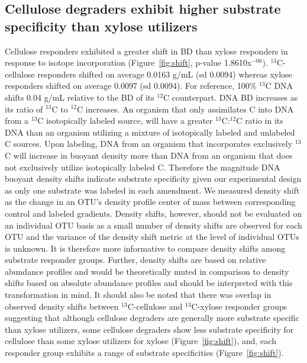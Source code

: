 \subsection{Cellulose degraders exhibit higher substrate specificity than xylose
utilizers} 
Cellulose responders exhibited a greater shift in BD than xylose
responders in response to isotope incorporation (Figure~\ref{fig:shift},
p-value 1.8610x$^{-06}$). $^{13}$C-cellulose responders shifted on average 0.0163
g/mL (sd 0.0094) whereas xylose responders shifted on average 0.0097 (sd
0.0094). For reference, 100\% $^{13}$C DNA shifts 0.04 g/mL relative to the BD
of its $^{12}$C counterpart. DNA BD increases as its ratio of $^{13}$C to
$^{12}$C increases. An organism that only assimilates C into DNA from a
$^{13}$C isotopically labeled source, will have a greater $^{13}$C:$^{12}$C
ratio in its DNA than an organism utilizing a mixture of isotopically labeled
and unlabeled C sources. Upon labeling, DNA from an organism that incorporates
exclusively $^{13}$C will increase in buoyant density more than DNA from an
organism that does not exclusively utilize isotopically labeled C. Therefore
the magnitude DNA buoyant density shifts indicate substrate specificity given
our experimental design as only one substrate was labeled in each amendment. We
measured density shift as the change in an OTU's density profile center of mass
between corresponding control and labeled gradients. Density shifts, however,
should not be evaluated on an individual OTU basis as a small number of density
shifts are observed for each OTU and the variance of the density shift metric
at the level of individual OTUs is unknown. It is therefore more informative to
compare density shifts among substrate responder groups. Further, density
shifts are based on relative abundance profiles and would be theoretically
muted in comparison to density shifts based on absolute abundance profiles and
should be interpreted with this transformation in mind. It should also be noted
that there was overlap in observed density shifts between $^{13}$C-cellulose
and $^{13}$C-xylose responder groups suggesting that although cellulose
degraders are generally more substrate specific than xylose utilizers, some
cellulose degraders show less substrate specificity for cellulose than some
xylose utilizers for xylose (Figure~\ref{fig:shift}), and, each responder group
exhibits a range of substrate specificities (Figure~\ref{fig:shift}).
